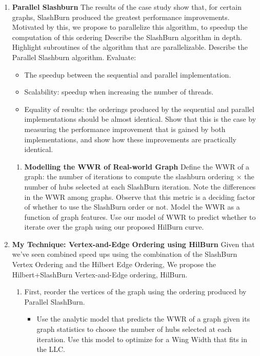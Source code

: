 \begin{enumerate}[label*=\arabic*.]
  \item {\textbf{Parallel Slashburn}
  The results of the case study show that, for certain graphs, SlashBurn produced the greatest performance improvements. Motivated by this, we propose to parallelize this algorithm, to speedup the computation of this ordering 
  Describe the SlashBurn algorithm in depth. Highlight subroutines of the algorithm that are parallelizable. Describe the Parallel Slashburn algorithm. Evaluate:
  \begin{itemize}
    \item The speedup between the sequential and parallel implementation.
    \item Scalability: speedup when increasing the number of threads.
    \item Equality of results: the orderings produced by the sequential and parallel implementations should be almost identical. 
    Show that this is the case by measuring the performance improvement that is gained by both implementations, and show how these improvements are practically identical.
  \end{itemize}
  }
  \begin{enumerate}[label*=\arabic*.]
    \item {\textbf{Modelling the \ac{WWR} of Real-world Graph}
    Define the \ac{WWR} of a graph: the number of iterations to compute the slashburn ordering $\times$ the number of hubs selected at each SlashBurn iteration.
    Note the differences in the \ac{WWR} among graphs. Observe that this metric is a deciding factor of whether to use the SlashBurn order or not. 
    Model the \ac{WWR} as a function of graph features. Use our model of \ac{WWR} to predict whether to iterate over the graph using our proposed HilBurn curve.
    }
  \end{enumerate}
  \item {\textbf{My Technique: Vertex-and-Edge Ordering using HilBurn}
    Given that we've seen combined speed ups using the combination of the SlashBurn Vertex Ordering and the Hilbert Edge Ordering, We propose the Hilbert+SlashBurn Vertex-and-Edge ordering, HilBurn.
    \begin{enumerate}
      \item First, reorder the vertices of the graph using the ordering produced by Parallel SlashBurn. 
      \begin{itemize}
      \item Use the analytic model that predicts the \ac{WWR} of a graph given its graph statistics to choose the number of hubs selected at each iteration. Use this model to optimize for a Wing Width that fits in the LLC.

\end{itemize}
\end{enumerate}}
\end{enumerate}
